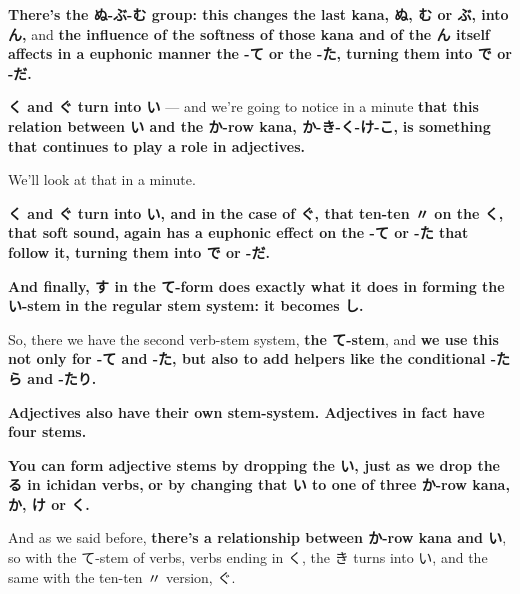 {}

\stopsectionlevel

\startsectionlevel[title={ぬ-ぶ-む group},reference={ぬ-ぶ-む-group}]

{\bf There's the ぬ-ぶ-む group: this changes the last kana, ぬ, む or ぶ, into ん,} and {\bf the influence of the softness of those kana and of the ん itself} {\bf affects in a euphonic manner the -て or the -た, turning them into で or -だ.}

\stopsectionlevel

\startsectionlevel[title={く-ぐ group},reference={く-ぐ-group}]

{\bf く and ぐ turn into い} --- and we're going to notice in a minute {\bf that this relation between い and the か-row kana, か-き-く-け-こ,} {\bf is something that continues to play a role in adjectives.}

We'll look at that in a minute.

{\bf く and ぐ turn into い, and in the case of ぐ, that ten-ten 〃 on the く, that soft sound,} {\bf again has a euphonic effect on the -て or -た that follow it, turning them into で or -だ.}

\stopsectionlevel

\startsectionlevel[title={す group},reference={す-group}]

{\bf And finally, す in the て-form does exactly what it does in forming the い-stem} {\bf in the regular stem system: it becomes し.}

\thinrule

So, there we have the second verb-stem system, {\bf the て-stem}, and {\bf we use this not only for -て and -た, but also to add helpers like the conditional -たら and -たり.}

\stopsectionlevel

\stopsectionlevel

\startsectionlevel[title={The Adjective stem system},reference={the-adjective-stem-system}]

{\bf Adjectives also have their own stem-system. Adjectives in fact have four stems.}

{}

{\bf You can form adjective stems by dropping the い, just as we drop the る in ichidan verbs,} {\bf or by changing that い to one of three か-row kana, か, け or く.}

\thinrule

And as we said before, {\bf there's a relationship between か-row kana and い}, so with the て-stem of verbs, verbs ending in く, the き turns into い, and the same with the ten-ten 〃 version, ぐ.

